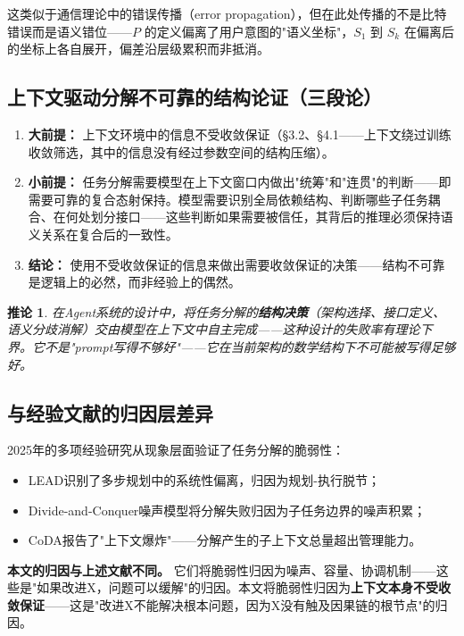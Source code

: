 \documentclass[11pt,a4paper]{ctexart}
\newtheorem{corollary}[theorem]{推论}
\begin{document}
这类似于通信理论中的错误传播（error propagation），但在此处传播的不是比特错误而是语义错位——$P$ 的定义偏离了用户意图的"语义坐标"，$S_1$ 到 $S_k$ 在偏离后的坐标上各自展开，偏差沿层级累积而非抵消。

\subsection{上下文驱动分解不可靠的结构论证（三段论）}

\begin{enumerate}[leftmargin=*]
    \item \textbf{大前提：} 上下文环境中的信息不受收敛保证（§3.2、§4.1——上下文绕过训练收敛筛选，其中的信息没有经过参数空间的结构压缩）。
    \item \textbf{小前提：} 任务分解需要模型在上下文窗口内做出"统筹"和"连贯"的判断——即需要可靠的复合态射保持。模型需要识别全局依赖结构、判断哪些子任务耦合、在何处划分接口——这些判断如果需要被信任，其背后的推理必须保持语义关系在复合后的一致性。
    \item \textbf{结论：} 使用不受收敛保证的信息来做出需要收敛保证的决策——结构不可靠是逻辑上的必然，而非经验上的偶然。
\end{enumerate}

\begin{corollary}
    在Agent系统的设计中，将任务分解的\textbf{结构决策}（架构选择、接口定义、语义分歧消解）交由模型在上下文中自主完成——这种设计的失败率有理论下界。它不是"prompt写得不够好"——它在当前架构的数学结构下不可能被写得足够好。
\end{corollary}

\subsection{与经验文献的归因层差异}

2025年的多项经验研究从现象层面验证了任务分解的脆弱性：

\begin{itemize}[leftmargin=*]
    \item LEAD\cite{LEAD2025}识别了多步规划中的系统性偏离，归因为规划-执行脱节；
    \item Divide-and-Conquer噪声模型将分解失败归因为子任务边界的噪声积累；
    \item CoDA报告了"上下文爆炸"——分解产生的子上下文总量超出管理能力。
\end{itemize}

\textbf{本文的归因与上述文献不同。} 它们将脆弱性归因为噪声、容量、协调机制——这些是"如果改进X，问题可以缓解"的归因。本文将脆弱性归因为\textbf{上下文本身不受收敛保证}——这是"改进X不能解决根本问题，因为X没有触及因果链的根节点"的归因。
\end{document}
